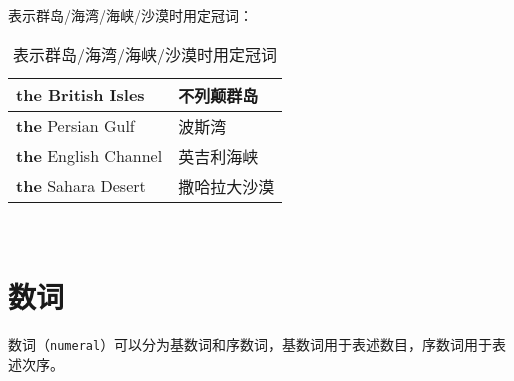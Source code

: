\documentclass[UTF8]{ctexart}
\begin{document}
    表示群岛/海湾/海峡/沙漠时用定冠词：
    \begin{table}[h!]
        \begin{center}
            \ttfamily
            \begin{tabular}{p{180pt}|p{100pt}}
                \hline
                \textbf{the} British Isles&不列颠群岛\\ \hline
                \textbf{the} Persian Gulf&波斯湾\\ \hline
                \textbf{the} English Channel&英吉利海峡\\ \hline
                \textbf{the} Sahara Desert&撒哈拉大沙漠\\ \hline
            \end{tabular}
            \rmfamily
            \caption{表示群岛/海湾/海峡/沙漠时用定冠词}
        \end{center}
    \end{table}\\

\newpage

\section{数词}
    数词（\texttt{numeral}）可以分为基数词和序数词，基数词用于表述数目，序数词用于表述次序。
\end{document}

